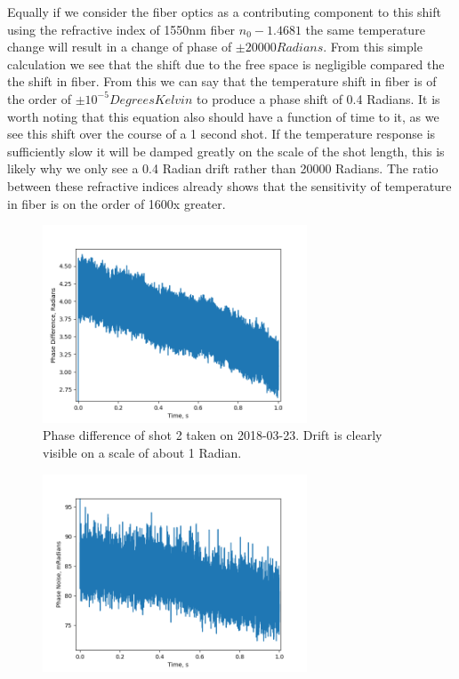 \documentclass[12pt,a4paper,oneside]{report}
\begin{document}
Equally if we consider the fiber optics as a contributing component to this shift using the refractive index of 1550nm fiber $n_{0} - 1.4681$ the same temperature change will result in a change of phase of $\pm 20000 Radians$. From this simple calculation we see that the shift due to the free space is negligible compared the the shift in fiber. From this we can say that the temperature shift in fiber is of the order of $\pm 10^{-5} Degrees Kelvin$ to produce a phase shift of 0.4 Radians. It is worth noting that this equation also should have a function of time to it, as we see this shift over the course of a 1 second shot. If the temperature response is sufficiently slow it will be damped greatly on the scale of the shot length, this is likely why we only see a 0.4 Radian drift rather than 20000 Radians. The ratio between these refractive indices already shows that the sensitivity of temperature in fiber is on the order of 1600x greater.

\begin{figure}[H] 
\includegraphics[width=0.7\textwidth, center,angle=0]{DImages/Phase_Difference_shot_2_Date_20180323-1.png}
\caption{Phase difference of shot 2 taken on 2018-03-23. Drift is clearly visible on a scale of about 1 Radian.}
\label{fig:PD-shot-2-20180323}
\end{figure}

\begin{figure}[H] 
\includegraphics[width=0.7\textwidth, center,angle=0]{DImages/Phase_Noise_for_Scene_shot_2_with_bandwidth___1000_Date_20180323.png}
\caption{}
\label{fig:PN-shot-2-20180323-bw-1000}
\end{figure}
\end{document}
